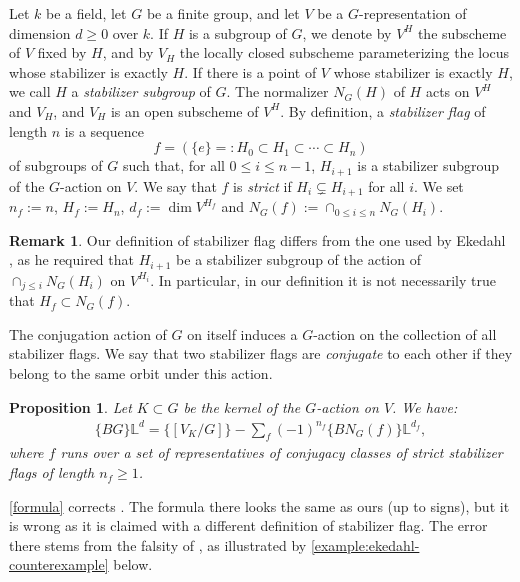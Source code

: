 \documentclass[12 pt]{amsart}
\theoremstyle{plain}
\newtheorem{proposition}[theorem]{Proposition}
\theoremstyle{definition}
\newtheorem{remark}[theorem]{Remark}
\theoremstyle{remark}
\numberwithin{equation}{section}
\renewcommand{\L}{\mathbb L}
\begin{document}
	\smallskip
	 Let $k$ be a field, let $G$ be a finite group, and let $V$ be a
	 $G$-representation of dimension $d\geq 0$ over $k$. If $H$ is a
	 subgroup of $G$, we denote by $V^H$ the subscheme of $V$ fixed by $H$,
	 and by $V_H$ the locally closed subscheme parameterizing the locus whose stabilizer is exactly $H$. 
	 If there is a point of $V$ whose stabilizer is exactly $H$, we call $H$ a
	 \emph{stabilizer subgroup} of $G$. 
	 The normalizer $N_G(H)$ of $H$ acts on $V^H$ and $V_H$, and $V_H$ is an open subscheme of $V^H$. By definition, a \emph{stabilizer flag} of length $n$ is a sequence 
	\[f = (\{e\}=:H_0 \subset H_1  \subset \cdots \subset H_n)\] 
	of subgroups of $G$ such that, for all $0\leq i\leq n-1$, $H_{i+1}$ is a stabilizer subgroup of the $G$-action on $V$. We say that $f$ is \emph{strict} if $H_i\subsetneq H_{i+1}$ for all $i$. We set $n_f:=n$, $H_f:=H_n$, $d_f:=\dim V^{H_f}$ and $N_G(f):=\cap_{0\leq i\leq n} N_G(H_i)$.
	
	\begin{remark}
	Our definition of stabilizer flag differs from the one used by Ekedahl
	\cite[p. 10]{ekedahlGeometricInvariantFinite2009}, as he required that $H_{i+1}$ be a stabilizer subgroup of the action of $\cap_{j\leq i}N_G(H_i)$ on $V^{H_i}$. In particular, in our definition it is not necessarily true that $H_f\subset N_G(f)$.
	\end{remark}
	
	The conjugation action of $G$ on itself induces a $G$-action on the
	collection of all stabilizer flags. We say that two stabilizer flags are
	\emph{conjugate} to each other if they belong to the same orbit under this action.

\begin{proposition}\label{formula}
 Let $K\subset G$ be the kernel of the $G$-action on $V$. We have:
 \begin{align}
	 \label{equation:inclusion-exclusion-stacky-class}
	\{BG\}\L^d=\{[V_K/G]\}-\sum_f (-1)^{n_f}\{BN_G(f)\}\L^{d_f},
 \end{align}
where $f$ runs over a set of representatives of conjugacy classes of strict stabilizer flags of length $n_f\geq 1$.
\end{proposition}

\autoref{formula} corrects \cite[Thm.\
3.4]{ekedahlGeometricInvariantFinite2009}. The formula there looks the same as
ours (up to signs), but it is wrong as it is claimed with a different definition
of stabilizer flag. The error there stems from the falsity of \cite[Lem.\
3.3(iv)]{ekedahlGeometricInvariantFinite2009},
as illustrated by \autoref{example:ekedahl-counterexample} below.
\end{document}
